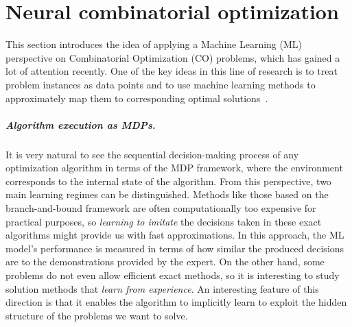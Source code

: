 \documentclass[a4paper]{report}
\theoremstyle{definition}
\theoremstyle{plain}
\begin{document}
\chapter{Neural combinatorial optimization}


This section introduces the idea of applying a Machine Learning (ML) perspective
on Combinatorial Optimization (CO) problems, which has gained a lot of
attention recently. One of the key ideas in this line of research is to treat problem
instances as data points and to use machine learning methods to approximately
map them to corresponding optimal solutions~\cite{bengioMachineLearningCombinatorial2020}.

\paragraph{Algorithm execution as MDPs.}
It is very natural to see the sequential decision-making process of any
optimization algorithm in terms of the MDP framework, where the environment
corresponds to the internal state of the algorithm. From this perspective, two
main learning regimes can be distinguished.
Methods like those based on the branch-and-bound framework are
often computationally too expensive for practical purposes, so \textit{learning
  to imitate} the decisions taken in these exact algorithms might provide us
with fast approximations. In this approach, the ML model's performance is
measured in terms of how similar the produced decisions are to the
demonstrations provided by the expert.
On the other hand, some problems do not even allow efficient exact methods, so it is
interesting to study solution methods that \textit{learn from experience}. An
interesting feature of this direction is that it enables the algorithm to implicitly
learn to exploit the hidden structure of the problems we want to solve.
\end{document}
